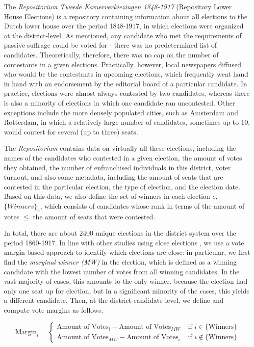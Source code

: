\documentclass[12pt]{article}
\begin{document}
    The \textit{Repositorium Tweede Kamerverkiezingen 1848-1917} (Repository Lower House Elections) is a repository containing information about all elections to the Dutch lower house over the period 1848-1917, in which elections were organized at the district-level. As mentioned, any candidate who met the requirements of passive suffrage could be voted for - there was no predetermined list of candidates. Theoretically, therefore, there was no cap on the number of contestants in a given elections. Practically, however, local newspapers diffused who would be the contestants in upcoming elections, which frequently went hand in hand with an endorsement by the editorial board of a particular candidate. In practice, elections were almost always contested by two candidates, whereas there is also a minority of elections in which one candidate ran uncontested. Other exceptions include the more densely populated cities, such as Amsterdam and Rotterdam, in which a relatively large number of candidates, sometimes up to 10, would contest for several (up to three) seats. 

    The \textit{Repositorium} contains data on virtually all these elections, including the names of the candidates who contested in a given election, the amount of votes they obtained, the number of enfranchised individuals in this district, voter turnout, and also some metadata, including the amount of seats that are contested in the particular election, the type of election, and the election date. Based on this data, we also define the set of winners in each election $e$, $\{ Winners \}_e$, which consists of candidates whose rank in terms of the amount of votes $\leq$ the amount of seats that were contested. 

    In total, there are about 2400 unique elections in the district system over the period 1860-1917. In line with other studies using close elections \citep[e.g.][]{lee2008randomized}, we use a vote margin-based approach to identify which elections are close: in particular, we first find the \textit{marginal winner (MW)} in the election, which is defined as a winning candidate with the lowest number of votes from all winning candidates. In the vast majority of cases, this amounts to the only winner, because the election had only one seat up for election, but in a significant minority of the cases, this yields a different candidate. Then, at the district-candidate level, we define and compute vote margins as follows:

    \begin{equation}
        \text{Margin}_i = \begin{cases}
            \text{Amount of Votes}_i - \text{Amount of Votes}_{MW} &\mbox{ if } i \in \{ \text{Winners} \} \\
            \text{Amount of Votes}_{MW} - \text{Amount of Votes}_i &\mbox{ if } i \notin \{ \text{Winners} \} 
            \end{cases}
    \end{equation}
\end{document}
